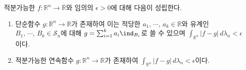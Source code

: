 \begin{theorem}\label{thm:integrableApprox}
    적분가능한 $f:\mathbb{R}^n\to\overline{\mathbb{R}}$와 임의의 $\epsilon>0$에 대해 다음이 성립한다.
    \begin{enumerate}
        \item 단순함수 $g:\mathbb{R}^n\to\mathbb{R}$가 존재하여 이는 적당한 $a_1,\,\cdots,\,a_k\in\mathbb{R}$와 유계인 $B_1,\,\cdots,\,B_k\in\mathcal{S}_n$에 대해 $g=\sum_{i=1}^ka_i\ind_{B_i}$로 쓸 수 있으며 $\int_{\mathbb{R}^n}|f-g|\,d\lambda_n<\epsilon$이다.
        \item 적분가능한 연속함수 $g:\mathbb{R}^n\to\mathbb{R}$가 존재하여 $\int_{\mathbb{R}^n}|f-g|\,d\lambda_n<\epsilon$이다.
    \end{enumerate}
\end{theorem}

